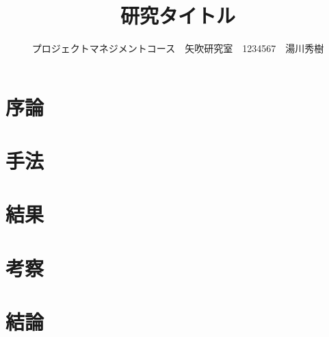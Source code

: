 \documentclass[uplatex,twocolumn,dvipdfmx,10pt]{jsarticle}
\title{\vspace{-5mm}\fontsize{14pt}{0pt}\selectfont 研究タイトル} %
\author{\normalsize プロジェクトマネジメントコース　矢吹研究室　1234567　湯川秀樹} %
\date{}
\begin{document}
\maketitle

\section{序論}





\section{手法}





\section{結果}%





\section{考察}%





\section{結論}%







\end{document}
